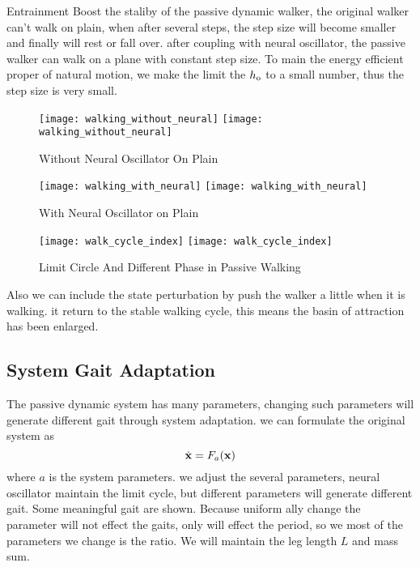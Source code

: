 Entrainment Boost the staliby of the passive dynamic walker, 
the original walker can't walk on plain, when after several steps, the step size will become smaller and finally will rest or fall over.
after coupling with neural oscillator, the passive walker can walk on a plane with constant step size.
To main the energy efficient proper of natural motion, we make the limit the $h_{\mathrm{o}}$ to a small number, thus the step size is very small.

\begin{figure}[!htbp]
  \begin{center}
    \leavevmode
    \ifpdf
      \texttt{[image: walking\_without\_neural]}
    \else
      \texttt{[image: walking\_without\_neural]}
    \fi
    \caption{Without Neural Oscillator On Plain}
    \label{fig:fwalkingphase}
\end{center}
\end{figure}

\begin{figure}[!htbp]
  \begin{center}
    \leavevmode
    \ifpdf
      \texttt{[image: walking\_with\_neural]}
    \else
      \texttt{[image: walking\_with\_neural]}
    \fi
    \caption{With Neural Oscillator on Plain}
    \label{fig:fourphaselimitcycle}
\end{center}
\end{figure}

\begin{figure}[!htbp]
  \begin{center}
    \leavevmode
    \ifpdf
      \texttt{[image: walk\_cycle\_index]}
    \else
      \texttt{[image: walk\_cycle\_index]}
    \fi
    \caption{Limit Circle And Different Phase in Passive Walking}
    \label{fig:fourphaselimitcycle}
\end{center}
\end{figure}


Also we can include the state perturbation by push the walker a little when it is walking.
it return to the stable walking cycle, this means the basin of attraction has been enlarged.





\subsection{System Gait Adaptation}
The passive dynamic system has many parameters, changing such parameters will generate different gait through system adaptation.
we can formulate the original system as
\[
\dot{\mathbf{x}}=F_a(\mathbf{x})
\]
where $a$ is the system parameters.
we adjust the several parameters, neural oscillator maintain the limit cycle, but different parameters will generate different gait.
Some meaningful gait are shown.
Because uniform ally change the parameter will not effect the gaits, only will effect the period, so we most of the parameters we change is the ratio.
We will maintain the leg length $L$ and mass sum.
